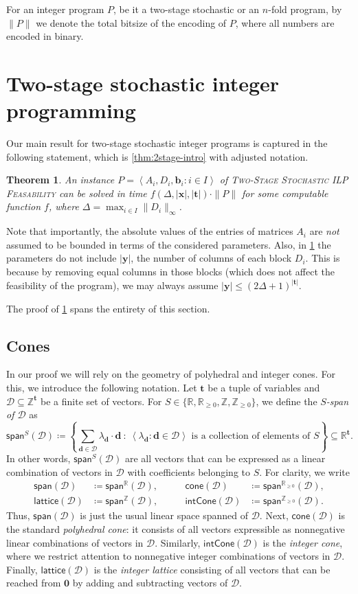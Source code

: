 \documentclass{article}
\newtheorem{theorem}{Theorem}\newtheorem{lemma}[theorem]{Lemma}\newtheorem{proposition}[theorem]{Proposition}\newtheorem{corollary}[theorem]{Corollary}\newtheorem{definition}[theorem]{Definition}\newtheorem{claim}[theorem]{Claim}\newtheorem{remark}[theorem]{Remark}\newtheorem{observation}[theorem]{Observation}\newtheorem{conjecture}[theorem]{Conjecture}\newtheorem{example}[theorem]{Example}
\renewcommand{\leq}{\leqslant}
\renewcommand{\geq}{\geqslant}
\newcommand{\Dd}{\mathcal{D}}
\newcommand{\Z}{\mathbb{Z}}
\newcommand{\Zn}{\Z_{\geq 0}}
\newcommand{\R}{\mathbb{R}}
\newcommand{\myRn}{\R_{\geq 0}} %
\newcommand{\tup}[1]{{\mathbf{#1}}}
\newcommand{\xx}{\tup x}
\newcommand{\yy}{\tup y}
\newcommand{\tv}{\tup t}
\newcommand{\bb}{\tup b}
\newcommand{\dd}{\tup d}
\newcommand{\zero}{\tup 0}
\newcommand{\mset}[1]{\left\langle #1\right\rangle}
\newcommand{\stageFeas}{\textsc{Two-Stage Stochastic ILP Feasability}}
\newcommand{\nfold}{$n$-fold}
\newcommand{\stage}{two-stage stochastic}
\newcommand{\realcone}{\mathsf{cone}}
\newcommand{\intcone}{\mathsf{intCone}}
\newcommand{\lattice}{\mathsf{lattice}}
\newcommand{\spn}{\mathsf{span}}
\begin{document}
\medskip

For an integer program $P$, be it a \stage{} or an \nfold{} program, by $\|P\|$ we denote the total bitsize of the encoding of $P$, where all numbers are encoded in binary.
\section{Two-stage stochastic integer programming}

Our main result for \stage{} integer programs is captured in the following statement, which is \cref{thm:2stage-intro} with adjusted notation.

\begin{theorem}\label{thm:2stage-main}
An instance $P=\mset{A_i,D_i,\bb_i\colon i\in I}$ of \stageFeas{} can be solved in time $f(\Delta,|\xx|,|\tv|)\cdot \|P\|$ for some computable function $f$, where $\Delta=\max_{i\in I} \|D_i\|_\infty$.
\end{theorem}

Note that importantly, the absolute values of the entries of matrices $A_i$ are {\em{not}} assumed to be bounded in terms of the considered parameters. Also, in \cref{thm:2stage-main} the parameters do not include $|\yy|$, the  number of columns of each block $D_i$. This is because by removing equal columns in those blocks (which does not affect the feasibility of the program), we may always assume $|\yy|\leq (2\Delta+1)^{|\tv|}$.

The proof of \cref{thm:2stage-main} spans the entirety of this section.

\subsection{Cones}

In our proof we will rely on the geometry of polyhedral and integer cones. For this, we introduce the following notation. Let $\tv$ be a tuple of variables and $\Dd\subseteq \Z^\tv$ be a finite set of vectors.
For $S\in \{\R,\myRn,\Z,\Zn\}$, we define the {\em{$S$-span of $\Dd$}} as
$$\spn^S(\Dd)\coloneqq \left\{\sum_{\dd\in \Dd} \lambda_\dd\cdot  \dd~\colon~\mset{\lambda_\dd\colon \dd\in \Dd} \textrm{ is a collection of elements of }S\right\}\subseteq \R^{\tv}.$$
In other words, $\spn^S(\Dd)$ are all vectors that can be expressed as a linear combination of vectors in $\Dd$ with coefficients belonging to $S$.
For clarity, we write
\begin{align*}
\spn(\Dd)&\coloneqq \spn^{\R}(\Dd), &\qquad \realcone(\Dd)&\coloneqq \spn^{\myRn}(\Dd),\\
\lattice(\Dd)&\coloneqq \spn^{\Z}(\Dd), &\qquad \intcone(\Dd)&\coloneqq \spn^{\Zn}(\Dd).
\end{align*}
Thus, $\spn(\Dd)$ is just the usual linear space spanned of $\Dd$. Next, $\realcone(\Dd)$ is the standard {\em{polyhedral cone}}: it consists of all vectors expressible as nonnegative linear combinations of vectors in $\Dd$. Similarly, $\intcone(\Dd)$ is the {\em{integer cone}}, where we restrict attention to nonnegative integer combinations of vectors in $\Dd$. Finally, $\lattice(\Dd)$ is the {\em{integer lattice}} consisting of all vectors that can be reached from $\zero$ by adding and subtracting vectors of $\Dd$.
\end{document}
